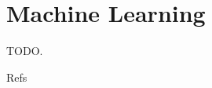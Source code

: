 
\chapter{Machine Learning}

TODO.


Refs \cite{rosasco2017notes,friedman2001elements,murphy2012machine}

